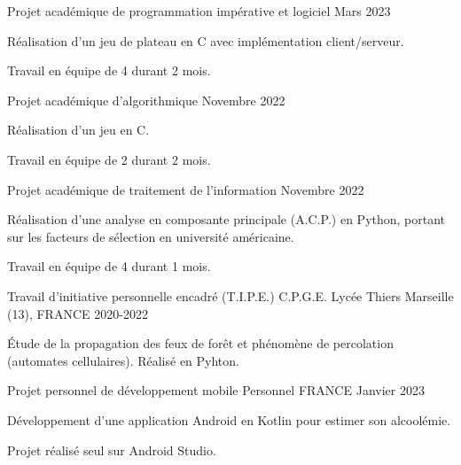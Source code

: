 \begin{cventries}
  \cventry
    {Projet académique de programmation impérative et logiciel} %
    {} %
    {} %
    {Mars 2023} %
    {
      \begin{cvitems} %
        \item{Réalisation d'un jeu de plateau en C avec implémentation client/serveur.}
        \item{Travail en équipe de 4 durant 2 mois.}
      \end{cvitems}
    }

  \cventry
    {Projet académique d'algorithmique} %
    {} %
    {} %
    {Novembre 2022} %
    {
      \begin{cvitems} %
        \item{Réalisation d'un jeu en C.}
        \item{Travail en équipe de 2 durant 2 mois.}
      \end{cvitems}
    }

  \cventry
    {Projet académique de traitement de l'information} %
    {} %
    {} %
    {Novembre 2022} %
    {
      \begin{cvitems} %
        \item{Réalisation d'une analyse en composante principale (A.C.P.) en Python, portant sur les facteurs de sélection en université américaine.}
        \item{Travail en équipe de 4 durant 1 mois.}
      \end{cvitems}
    }

  \cventry
    {Travail d'initiative personnelle encadré (T.I.P.E.)} %
    {C.P.G.E. Lycée Thiers} %
    {Marseille (13), FRANCE} %
    {2020-2022} %
    {
      \begin{cvitems} %
        \item{Étude de la propagation des feux de forêt et phénomène de percolation (automates cellulaires). Réalisé en Pyhton.}
      \end{cvitems}
    }

  \cventry
    {Projet personnel de développement mobile} %
    {Personnel} %
    {FRANCE} %
    {Janvier 2023} %
    {
      \begin{cvitems} %
        \item{Développement d'une application Android en Kotlin pour estimer son alcoolémie.}
        \item{Projet réalisé seul sur Android Studio.}
      \end{cvitems}
    }


\end{cventries}